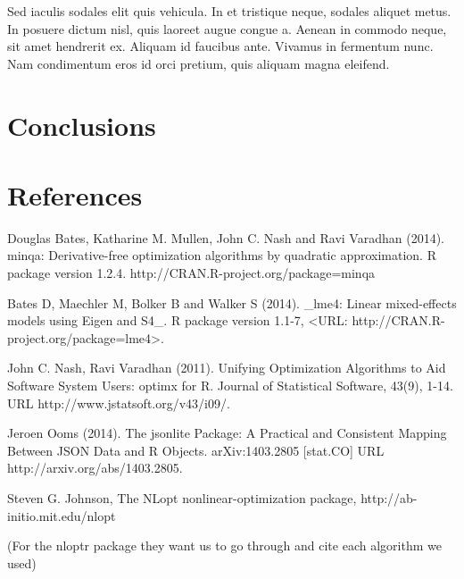 \documentclass[article]{jss}
\begin{document}
 Sed iaculis sodales elit quis vehicula. In et tristique neque, sodales aliquet metus. In posuere dictum nisl, quis laoreet augue congue a. Aenean in commodo neque, sit amet hendrerit ex. Aliquam id faucibus ante. Vivamus in fermentum nunc. Nam condimentum eros id orci pretium, quis aliquam magna eleifend. 

\section[Conclusions]{Conclusions}

\section[References]{References}



Douglas Bates, Katharine M. Mullen, John C. Nash and Ravi Varadhan (2014). minqa:
  Derivative-free optimization algorithms by quadratic approximation. R package version 1.2.4.
  http://CRAN.R-project.org/package=minqa

Bates D, Maechler M, Bolker B and Walker S (2014). _lme4: Linear mixed-effects models using Eigen
  and S4_. R package version 1.1-7, <URL: http://CRAN.R-project.org/package=lme4>.

John C. Nash, Ravi Varadhan (2011). Unifying Optimization Algorithms to Aid Software System
  Users: optimx for R. Journal of Statistical Software, 43(9), 1-14. URL
  http://www.jstatsoft.org/v43/i09/.

Jeroen Ooms (2014). The jsonlite Package: A Practical and Consistent Mapping Between JSON Data
  and R Objects. arXiv:1403.2805 [stat.CO] URL http://arxiv.org/abs/1403.2805.

Steven G. Johnson, The NLopt nonlinear-optimization package, http://ab-initio.mit.edu/nlopt
  
(For the nloptr package they want us to go through and cite each algorithm we used)  
  
\end{document}

